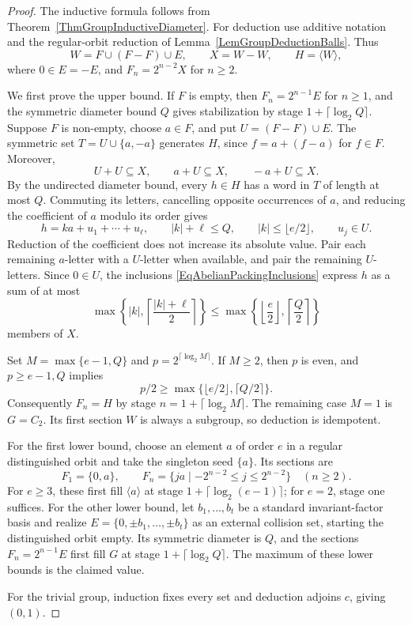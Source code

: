 \documentclass[12pt,english]{amsart}
\theoremstyle{definition}
\numberwithin{equation}{section}
\theoremstyle{remark}
\begin{document}
\begin{proof}
The inductive formula follows from
Theorem~\ref{ThmGroupInductiveDiameter}. For deduction use additive
notation and the regular-orbit reduction of
Lemma~\ref{LemGroupDeductionBalls}. Thus
\[
W=F\cup(F-F)\cup E,\qquad X=W-W,\qquad H=\langle W\rangle,
\]
where $0\in E=-E$, and $F_n=2^{n-2}X$ for $n\geqslant2$.

We first prove the upper bound. If $F$ is empty, then
$F_n=2^{n-1}E$ for $n\geqslant1$, and the symmetric diameter
bound $Q$ gives stabilization by stage
$1+\lceil\log_2 Q\rceil$. Suppose $F$ is non-empty, choose
$a\in F$, and put $U=(F-F)\cup E$. The symmetric set
$T=U\cup\{a,-a\}$ generates $H$, since
$f=a+(f-a)$ for $f\in F$. Moreover,
\begin{equation}\label{EqAbelianPackingInclusions}
U+U\subseteq X,\qquad a+U\subseteq X,\qquad -a+U\subseteq X.
\end{equation}
By the undirected diameter bound, every $h\in H$ has a word in
$T$ of length at most $Q$. Commuting its letters, cancelling
opposite occurrences of $a$, and reducing the coefficient of $a$
modulo its order gives
\[
h=ka+u_1+\cdots+u_\ell,\qquad
|k|+\ell\leqslant Q,\qquad
|k|\leqslant\lfloor e/2\rfloor,\qquad u_j\in U.
\]
Reduction of the coefficient does not increase its absolute value.
Pair each remaining $a$-letter with a $U$-letter when available,
and pair the remaining $U$-letters. Since $0\in U$, the inclusions
\eqref{EqAbelianPackingInclusions} express $h$ as a sum of at most
\[
\max\left\{|k|,\left\lceil\frac{|k|+\ell}{2}\right\rceil\right\}
\leqslant
\max\left\{\left\lfloor\frac e2\right\rfloor,
           \left\lceil\frac Q2\right\rceil\right\}
\]
members of $X$.

Set $M=\max\{e-1,Q\}$ and $p=2^{\lceil\log_2M\rceil}$.
If $M\geqslant2$, then $p$ is even, and $p\geqslant e-1,Q$
implies
\[
p/2\geqslant
\max\{\lfloor e/2\rfloor,\lceil Q/2\rceil\}.
\]
Consequently $F_n=H$ by stage
$n=1+\lceil\log_2M\rceil$. The remaining case $M=1$ is
$G=C_2$. Its first section $W$ is always a subgroup, so deduction
is idempotent.

For the first lower bound, choose an element $a$ of order $e$
in a regular distinguished orbit and take the singleton seed
$\{a\}$. Its sections are
\[
F_1=\{0,a\},\qquad
F_n=\{ja\mid -2^{n-2}\leqslant j\leqslant2^{n-2}\}
\quad(n\geqslant2).
\]
For $e\geqslant3$, these first fill $\langle a\rangle$ at stage
$1+\lceil\log_2(e-1)\rceil$; for $e=2$, stage one suffices.
For the other lower bound, let $b_1,\ldots,b_t$ be a standard
invariant-factor basis and realize
$E=\{0,\pm b_1,\ldots,\pm b_t\}$ as an external collision set,
starting the distinguished orbit empty. Its symmetric diameter
is $Q$, and the sections $F_n=2^{n-1}E$ first fill $G$ at
stage $1+\lceil\log_2Q\rceil$. The maximum of these lower
bounds is the claimed value.

For the trivial group, induction fixes every set and deduction
adjoins $c$, giving $(0,1)$.
\end{proof}
\end{document}
